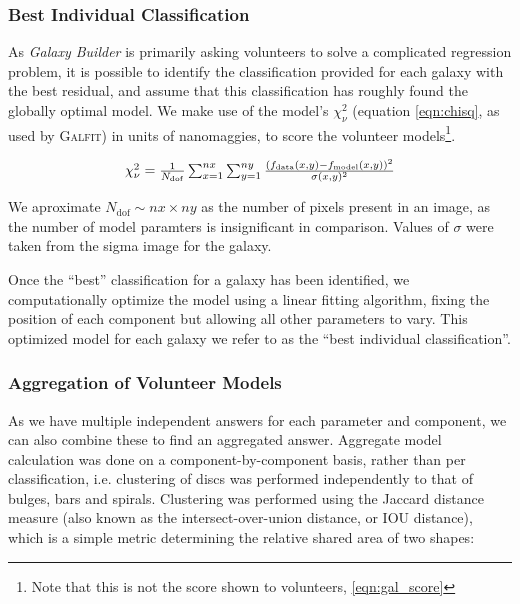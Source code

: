 \documentclass[../main.tex]{subfiles}
\begin{document}
\subsubsection{Best Individual Classification}

As \textit{Galaxy Builder} is primarily asking volunteers to solve a complicated regression problem, it is possible to identify the classification provided for each galaxy with the best residual, and assume that this classification has roughly found the globally optimal model. We make use of the model's $\chi_\nu^2$ (equation \ref{eqn:chisq}, as used by \textsc{Galfit}) in units of nanomaggies, to score the volunteer models\footnote{Note that this is not the score shown to volunteers, \ref{eqn:gal_score}}.

\begin{equation}
  \label{eqn:chisq}
  $$\chi_\nu^2 =\frac{1}{N_\mathrm{dof}}\sum_{x=1}^{nx}\sum_{y=1}^{ny}\frac{\left(f_\mathrm{data}(x, y) - f_\mathrm{model}(x, y)\right)^2}{\sigma(x, y)^2}$$
\end{equation}

We aproximate $N_\mathrm{dof} \sim nx \times ny$ as the number of pixels present in an image, as the number of model paramters is insignificant in comparison. Values of $\sigma$ were taken from the sigma image for the galaxy.

Once the ``best'' classification for a galaxy has been identified, we computationally optimize the model using a linear fitting algorithm, fixing the position of each component but allowing all other parameters to vary. This optimized model for each galaxy we refer to as the ``best individual classification''.

\subsubsection{Aggregation of Volunteer Models}
\label{sec:aggregation_of_volunteer_models}

As we have multiple independent answers for each parameter and component, we can also combine these to find an aggregated answer. Aggregate model calculation was done on a component-by-component basis, rather than per classification, i.e. clustering of discs was performed independently to that of bulges, bars and spirals. Clustering was performed using the Jaccard distance measure (also known as the intersect-over-union distance, or IOU distance), which is a simple metric determining the relative shared area of two shapes:
\end{document}

